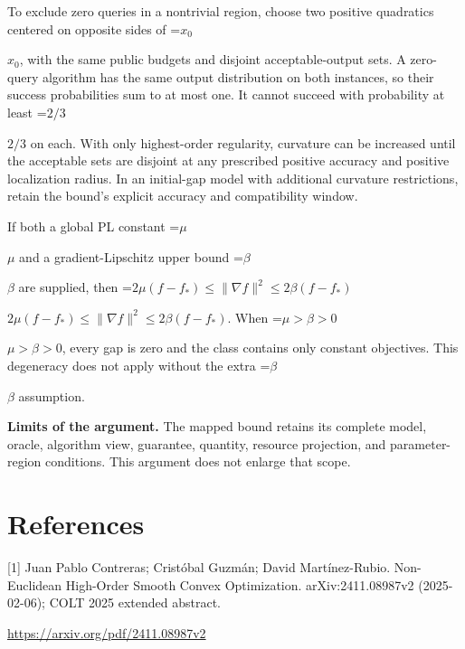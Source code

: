 \documentclass[10pt,a4paper]{article}
\newcommand{\AtlasMath}[1]{\par\begingroup\centering\setbox0=\hbox{$\displaystyle #1$}\ifdim\wd0>1.4\linewidth\typeout{ATLAS WIDE FORMULA: \the\wd0}\fi\ifdim\wd0>\linewidth\resizebox{\linewidth}{!}{\box0}\else\box0\fi\par\endgroup}
\newcommand{\AtlasInlineMath}[1]{\begingroup\setbox0=\hbox{$#1$}\ifdim\wd0>.4\linewidth\endgroup\AtlasMath{#1}\else\endgroup$#1$\fi}
\begin{document}
To exclude zero queries in a nontrivial region, choose two positive quadratics centered on opposite sides of \AtlasInlineMath{x_0}, with the same public budgets and disjoint acceptable-output sets. A zero-query algorithm has the same output distribution on both instances, so their success probabilities sum to at most one. It cannot succeed with probability at least \AtlasInlineMath{2/3} on each. With only highest-order regularity, curvature can be increased until the acceptable sets are disjoint at any prescribed positive accuracy and positive localization radius. In an initial-gap model with additional curvature restrictions, retain the bound's explicit accuracy and compatibility window.

If both a global PL constant \AtlasInlineMath{\mu} and a gradient-Lipschitz upper bound \AtlasInlineMath{\beta} are supplied, then \AtlasInlineMath{2\mu(f-f_*)\le\|\nabla f\|^2\le2\beta(f-f_*)}. When \AtlasInlineMath{\mu>\beta>0}, every gap is zero and the class contains only constant objectives. This degeneracy does not apply without the extra \AtlasInlineMath{\beta} assumption.

\textbf{Limits of the argument.} The mapped bound retains its complete model, oracle, algorithm view, guarantee, quantity, resource projection, and parameter-region conditions. This argument does not enlarge that scope.

\section{References}
[1] Juan Pablo Contreras; Cristóbal Guzmán; David Martínez-Rubio. Non-Euclidean High-Order Smooth Convex Optimization. arXiv:2411.08987v2 (2025-02-06); COLT 2025 extended abstract.

\url{https://arxiv.org/pdf/2411.08987v2}
\end{document}
